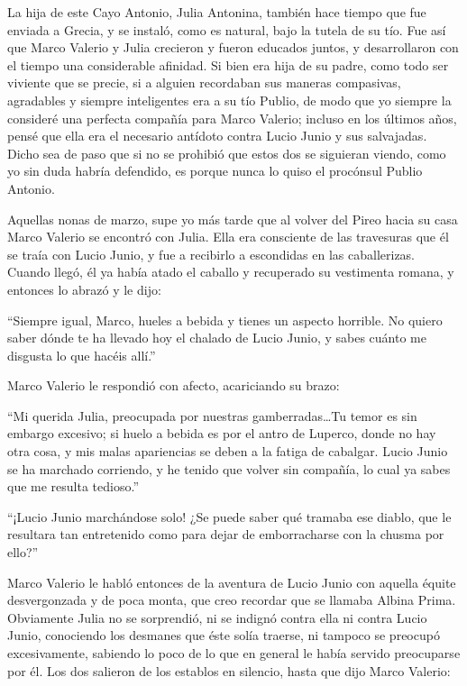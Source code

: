 \documentclass[11pt,openany]{book}
\begin{document}
La hija de este Cayo Antonio, Julia Antonina, también hace tiempo que fue enviada a Grecia, y se instaló, como es natural, bajo la tutela de su tío. Fue así que Marco Valerio y Julia crecieron y fueron educados juntos, y desarrollaron con el tiempo una considerable afinidad. Si bien era hija de su padre, como todo ser viviente que se precie, si a alguien recordaban sus maneras compasivas, agradables y siempre inteligentes era a su tío Publio, de modo que yo siempre la consideré una perfecta compañía para Marco Valerio; incluso en los últimos años, pensé que ella era el necesario antídoto contra Lucio Junio y sus salvajadas. Dicho sea de paso que si no se prohibió que estos dos se siguieran viendo, como yo sin duda habría defendido, es porque nunca lo quiso el procónsul Publio Antonio. 

Aquellas nonas de marzo, supe yo más tarde que al volver del Pireo hacia su casa Marco Valerio se encontró con Julia. Ella era consciente de las travesuras que él se traía con Lucio Junio, y fue a recibirlo a escondidas en las caballerizas. Cuando llegó, él ya había atado el caballo y recuperado su vestimenta romana, y entonces lo abrazó y le dijo: 

“Siempre igual, Marco, hueles a bebida y tienes un aspecto horrible. No quiero saber dónde te ha llevado hoy el chalado de Lucio Junio, y sabes cuánto me disgusta lo que hacéis allí.” 

Marco Valerio le respondió con afecto, acariciando su brazo: 

“Mi querida Julia, preocupada por nuestras gamberradas\dots Tu temor es sin embargo excesivo; si huelo a bebida es por el antro de Luperco, donde no hay otra cosa, y mis malas apariencias se deben a la fatiga de cabalgar. Lucio Junio se ha marchado corriendo, y he tenido que volver sin compañía, lo cual ya sabes que me resulta tedioso.” 

“¡Lucio Junio marchándose solo! ¿Se puede saber qué tramaba ese diablo, que le resultara tan entretenido como para dejar de emborracharse con la chusma por ello?” 

Marco Valerio le habló entonces de la aventura de Lucio Junio con aquella équite desvergonzada y de poca monta, que creo recordar que se llamaba Albina Prima. Obviamente Julia no se sorprendió, ni se indignó contra ella ni contra Lucio Junio, conociendo los desmanes que éste solía traerse, ni tampoco se preocupó excesivamente, sabiendo lo poco de lo que en general le había servido preocuparse por él. Los dos salieron de los establos en silencio, hasta que dijo Marco Valerio:
\end{document}
